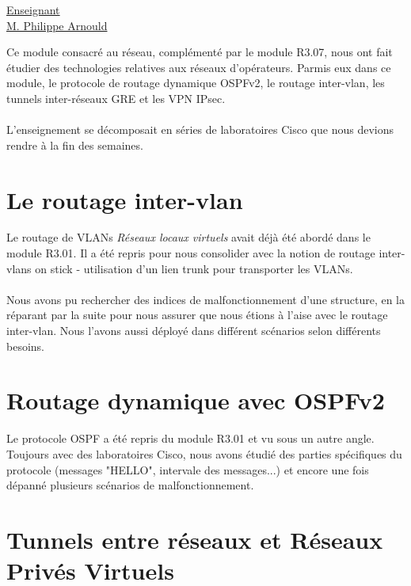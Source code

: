 \renewcommand{\figurename}{}

\vspace*{0.2cm}%
      \large
      \href{}{\color{black}Enseignant\\M. Philippe Arnould}\\%
      \normalsize
\vspace*{0.5cm}%

Ce module consacré au réseau, complémenté par le module R3.07, nous ont fait étudier des technologies relatives aux réseaux d'opérateurs. Parmis eux dans ce module, le protocole de routage dynamique OSPFv2, le routage inter-vlan, les tunnels inter-réseaux GRE et les VPN IPsec.
\\ \\
L'enseignement se décomposait en séries de laboratoires Cisco que nous devions rendre à la fin des semaines.

\section{Le routage inter-vlan}

Le routage de VLANs \textit{Réseaux locaux virtuels} avait déjà été abordé dans le module R3.01. Il a été repris pour nous consolider avec la notion de routage inter-vlans on stick - utilisation d'un lien trunk pour transporter les VLANs.
\\ \\
Nous avons pu rechercher des indices de malfonctionnement d'une structure, en la réparant par la suite pour nous assurer que nous étions à l'aise avec le routage inter-vlan. Nous l'avons aussi déployé dans différent scénarios selon différents besoins.

\section{Routage dynamique avec OSPFv2}

Le protocole OSPF a été repris du module R3.01 et vu sous un autre angle. Toujours avec des laboratoires Cisco, nous avons étudié des parties spécifiques du protocole (messages "HELLO", intervale des messages...) et encore une fois dépanné plusieurs scénarios de malfonctionnement.

\section{Tunnels entre réseaux et Réseaux Privés Virtuels}

